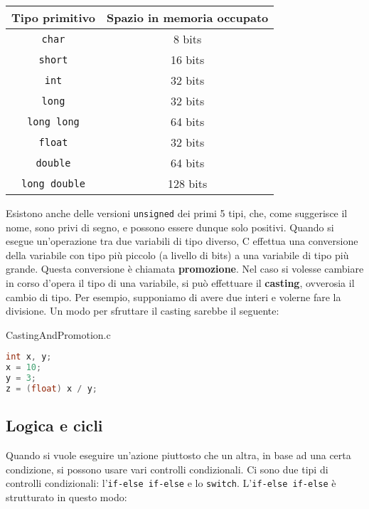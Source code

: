 \begin{center}
    \begin{tabular}{|c|c|}
        \hline
        \textbf{Tipo primitivo} & \textbf{Spazio in memoria occupato} \\
        \hline
        \verb|char| & 8 bits \\
        \verb|short| & 16 bits \\
        \verb|int| & 32 bits \\
        \verb|long| & 32 bits \\
        \verb|long long| & 64 bits \\
        \verb|float| & 32 bits \\
        \verb|double| & 64 bits \\
        \verb|long double| & 128 bits \\
        \hline
    \end{tabular}
\end{center}

Esistono anche delle versioni \verb|unsigned| dei primi 5 tipi, che, come suggerisce il nome, sono privi di segno, e possono essere dunque solo positivi.
\nwl
Quando si esegue un'operazione tra due variabili di tipo diverso, C effettua una conversione della variabile con tipo più piccolo (a livello di bits) a una variabile di tipo più grande. Questa conversione è chiamata \textbf{promozione}.
\nwl
Nel caso si volesse cambiare in corso d'opera il tipo di una variabile, si può effettuare il \textbf{casting}, ovverosia il cambio di tipo. Per esempio, supponiamo di avere due interi e volerne fare la divisione. Un modo per sfruttare il casting sarebbe il seguente:

\begin{codeblock}{CastingAndPromotion.c}
    \begin{lstlisting}[language = c]
int x, y;
x = 10;
y = 3;
z = (float) x / y;\end{lstlisting}
\end{codeblock}

\subsection{Logica e cicli}

Quando si vuole eseguire un'azione piuttosto che un altra, in base ad una certa condizione, si possono usare vari controlli condizionali. Ci sono due tipi di controlli condizionali: l'\verb|if-else if-else| e lo \verb|switch|. L'\verb|if-else if-else| è strutturato in questo modo:

